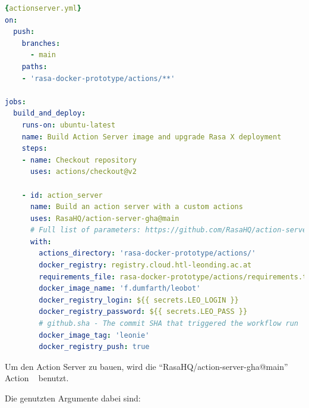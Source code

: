 \begin{lstlisting}[language=yaml,label={lst:actionserveryml},caption={action\_server.yml}]{actionserver.yml}
on:
  push:
    branches:
      - main
    paths:
    - 'rasa-docker-prototype/actions/**'

jobs:
  build_and_deploy:
    runs-on: ubuntu-latest
    name: Build Action Server image and upgrade Rasa X deployment
    steps:
    - name: Checkout repository
      uses: actions/checkout@v2

    - id: action_server
      name: Build an action server with a custom actions
      uses: RasaHQ/action-server-gha@main
      # Full list of parameters: https://github.com/RasaHQ/action-server-gha/tree/master#input-arguments
      with:
        actions_directory: 'rasa-docker-prototype/actions/'
        docker_registry: registry.cloud.htl-leonding.ac.at
        requirements_file: rasa-docker-prototype/actions/requirements.txt
        docker_image_name: 'f.dumfarth/leobot'
        docker_registry_login: ${{ secrets.LEO_LOGIN }}
        docker_registry_password: ${{ secrets.LEO_PASS }}
        # github.sha - The commit SHA that triggered the workflow run
        docker_image_tag: 'leonie'
        docker_registry_push: true
\end{lstlisting}

Um den Action Server zu bauen, wird die ``RasaHQ/action-server-gha@main'' Action ~\cite{actionServerAction} benutzt.

Die genutzten Argumente dabei sind:


